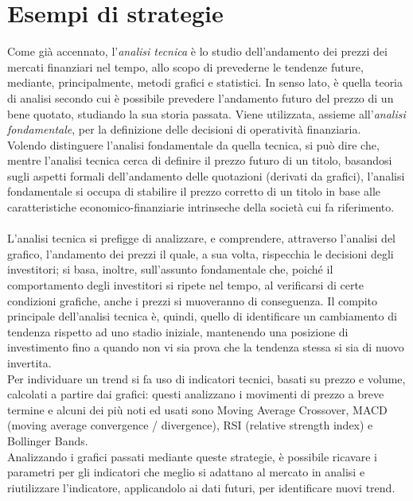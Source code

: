 \documentclass[a4paper,12pt]{report}
\begin{document}
\section{Esempi di strategie}
Come già accennato, l'\textit{analisi tecnica} è lo studio dell'andamento dei prezzi dei mercati finanziari nel tempo, allo scopo di prevederne le tendenze future, mediante, principalmente, metodi grafici e statistici. In senso lato, è quella teoria di analisi secondo cui è possibile prevedere l'andamento futuro del prezzo di un bene quotato, studiando la sua storia passata. Viene utilizzata, assieme all'\textit{analisi fondamentale}, per la definizione delle decisioni di operatività finanziaria.\\ Volendo distinguere l'analisi fondamentale da quella tecnica, si può dire che, mentre l'analisi tecnica cerca di definire il prezzo futuro di un titolo, basandosi sugli aspetti formali dell'andamento delle quotazioni (derivati da grafici), l'analisi fondamentale si occupa di stabilire il prezzo corretto di un titolo in base alle caratteristiche economico-finanziarie intrinseche della società cui fa riferimento.\\~\\L'analisi tecnica si prefigge di analizzare, e comprendere, attraverso l'analisi del grafico, l'andamento dei prezzi il quale, a sua volta, rispecchia le decisioni degli investitori;  si basa, inoltre, sull'assunto fondamentale che, poiché il comportamento degli investitori si ripete nel tempo, al verificarsi di certe condizioni grafiche, anche i prezzi si muoveranno di conseguenza. Il compito principale dell'analisi tecnica è, quindi, quello di identificare un cambiamento di tendenza rispetto ad uno stadio iniziale, mantenendo una posizione di investimento fino a quando non vi sia prova che la tendenza stessa si sia di nuovo invertita.\\
Per individuare un trend si fa uso di indicatori tecnici, basati su prezzo e volume, calcolati a partire dai grafici: questi analizzano i movimenti di prezzo a breve termine e alcuni dei più noti ed usati sono Moving Average Crossover, MACD (moving average convergence / divergence), RSI (relative strength index) e Bollinger Bands.\\
Analizzando i grafici passati mediante queste strategie, è possibile ricavare i parametri per gli indicatori che meglio si adattano al mercato in analisi e riutilizzare l'indicatore, applicandolo ai dati futuri, per identificare nuovi trend.
\end{document}

